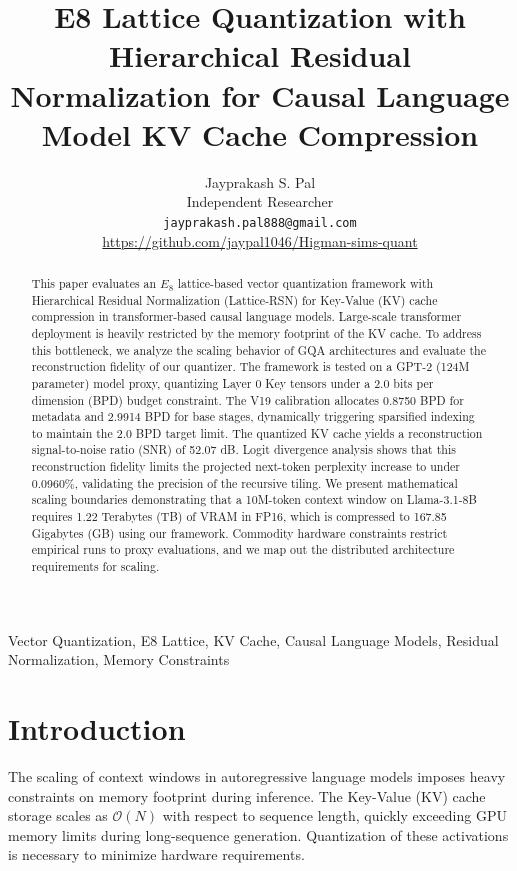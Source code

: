 \documentclass[journal,onecolumn,12pt]{IEEEtran}
\begin{document}
\title{E8 Lattice Quantization with Hierarchical Residual Normalization for Causal Language Model KV Cache Compression}

\author{
    \centering
    Jayprakash S. Pal\\
    \small Independent Researcher\\
    \small \texttt{jayprakash.pal888@gmail.com}\\
    \small \url{https://github.com/jaypal1046/Higman-sims-quant}
}

\maketitle

\begin{abstract}
This paper evaluates an $E_8$ lattice-based vector quantization framework with Hierarchical Residual Normalization (Lattice-RSN) for Key-Value (KV) cache compression in transformer-based causal language models. Large-scale transformer deployment is heavily restricted by the memory footprint of the KV cache. To address this bottleneck, we analyze the scaling behavior of GQA architectures and evaluate the reconstruction fidelity of our quantizer. The framework is tested on a GPT-2 (124M parameter) model proxy, quantizing Layer 0 Key tensors under a 2.0 bits per dimension (BPD) budget constraint. The V19 calibration allocates 0.8750 BPD for metadata and 2.9914 BPD for base stages, dynamically triggering sparsified indexing to maintain the 2.0 BPD target limit. The quantized KV cache yields a reconstruction signal-to-noise ratio (SNR) of 52.07 dB. Logit divergence analysis shows that this reconstruction fidelity limits the projected next-token perplexity increase to under 0.0960\%, validating the precision of the recursive tiling. We present mathematical scaling boundaries demonstrating that a 10M-token context window on Llama-3.1-8B requires 1.22 Terabytes (TB) of VRAM in FP16, which is compressed to 167.85 Gigabytes (GB) using our framework. Commodity hardware constraints restrict empirical runs to proxy evaluations, and we map out the distributed architecture requirements for scaling.
\end{abstract}

\begin{IEEEkeywords}
Vector Quantization, E8 Lattice, KV Cache, Causal Language Models, Residual Normalization, Memory Constraints
\end{IEEEkeywords}

\section{Introduction}
The scaling of context windows in autoregressive language models imposes heavy constraints on memory footprint during inference. The Key-Value (KV) cache storage scales as $\mathcal{O}(N)$ with respect to sequence length, quickly exceeding GPU memory limits during long-sequence generation. Quantization of these activations is necessary to minimize hardware requirements.
\end{document}
